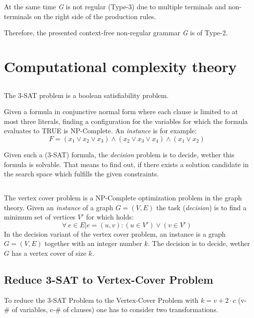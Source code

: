 \documentclass[11pt]{article}
\begin{document}
At the same time \emph{G} is not regular (Type-3) due to multiple terminals and non-terminals on the right side of the production rules.

Therefore, the presented context-free non-regular grammar \emph{G} is of Type-2.

\section{Computational complexity theory}
\subsection{}
The 3-SAT problem is a boolean satisfiability problem. 

Given a formula in conjunctive normal form where each clause is limited to at most three literals, finding a configuration for the variables for which the formula evaluates to TRUE is NP-Complete. An \emph{instance} is for example:
\begin{equation*}
	F=(x_1 \lor x_2\lor x_3)\land(x_2\lor x_3 \lor x_4)\land(x_1 \lor x_2)
\end{equation*}

Given such a (3-SAT) formula, the \emph{decision} problem is to decide, wether this formula is solvable. That means to find out, if there exists a solution candidate in the search space which fulfills the given constraints.

\subsection{}
The vertex cover problem is a NP-Complete optimization problem in the graph theory. Given an \emph{instance} of a graph  $G=(V,E)$ the task (\emph{decision}) is to find a minimum set of vertices $V'$ for which holds:
\begin{equation*}
	\forall \: e \in E| e=(u,v):(u\in V')\lor (v \in V')
\end{equation*}
In the decision variant of the vertex cover problem, an instance is a graph $G=(V,E)$ together with an integer number $k$. The decision is to decide, wether $G$ has a vertex cover of size $k$. 
\subsection{Reduce 3-SAT to Vertex-Cover Problem}
To reduce the 3-SAT Problem to the Vertex-Cover Problem with $k=v+2\cdot c$ (v-\# of variables, c-\# of clauses) one has to consider two transformations.
\end{document}
